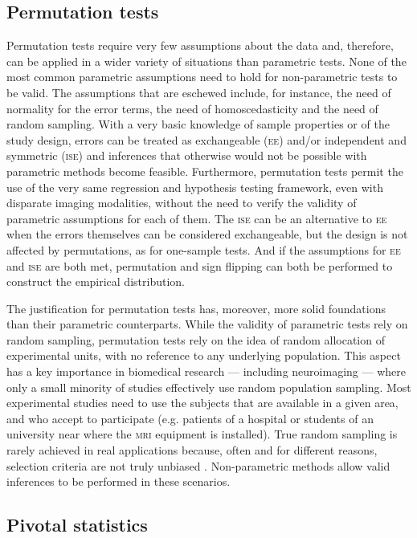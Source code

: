 \subsection{Permutation tests}

Permutation tests require very few assumptions about the data and, therefore, can be applied in a wider variety of situations than parametric tests. None of the most common parametric assumptions need to hold for non-parametric tests to be valid. The assumptions that are eschewed include, for instance, the need of normality for the error terms, the need of homoscedasticity and the need of random sampling. With a very basic knowledge of sample properties or of the study design, errors can be treated as exchangeable (\textsc{ee}) and/or independent and symmetric (\textsc{ise}) and inferences that otherwise would not be possible with parametric methods become feasible. Furthermore, permutation tests permit the use of the very same regression and hypothesis testing framework, even with disparate imaging modalities, without the need to verify the validity of parametric assumptions for each of them. The \textsc{ise} can be an alternative to \textsc{ee} when the errors themselves can be considered exchangeable, but the design is not affected by permutations, as for one-sample tests. And if the assumptions for \textsc{ee} and \textsc{ise} are both met, permutation and sign flipping can both be performed to construct the empirical distribution.

The justification for permutation tests has, moreover, more solid foundations than their parametric counterparts. While the validity of parametric tests rely on random sampling, permutation tests rely on the idea of random allocation of experimental units, with no reference to any underlying population. This aspect has a key importance in biomedical research --- including neuroimaging --- where only a small minority of studies effectively use random population sampling. Most experimental studies need to use the subjects that are available in a given area, and who accept to participate (e.g. patients of a hospital or students of an university near where the \textsc{mri} equipment is installed). True random sampling is rarely achieved in real applications because, often and for different reasons, selection criteria are not truly unbiased \citep{Ludbrook1998, Pesarin2010}. Non-parametric methods allow valid inferences to be performed in these scenarios.

\subsection{Pivotal statistics}

